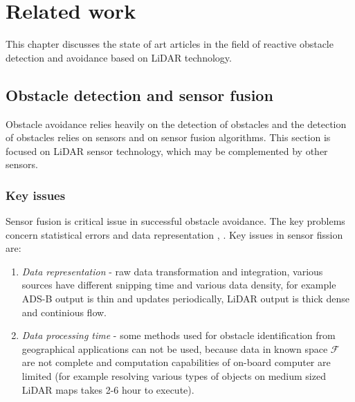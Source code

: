 \chapter{Related work}
This chapter discusses the state of art articles in the field of reactive obstacle detection and avoidance based on LiDAR technology. 


\section{Obstacle detection and sensor fusion}
Obstacle avoidance relies heavily on the detection of obstacles and the detection of obstacles relies on sensors and on sensor fusion algorithms. This section is focused on LiDAR sensor technology, which may be complemented by other sensors.   

\subsection{Key issues}
Sensor fusion is critical issue in successful obstacle avoidance. The key problems concern statistical errors and data representation \cite{gardi2014real}, \cite{ramasamy2014towards}. Key issues in sensor fission are:
\begin{enumerate}
    \item \textit{Data representation} - raw data transformation and integration, various sources have different snipping time and various data density, for example ADS-B output is thin and updates periodically, LiDAR output is thick dense and continious flow.
    \item \textit{Data processing time} - some methods used for obstacle identification from geographical applications can not be used, because data in known space $\mathscr{F}$ are not complete and computation capabilities of on-board computer are limited (for example 
    resolving various types of objects on medium sized LiDAR maps takes 2-6 hour to execute).
\end{enumerate}

